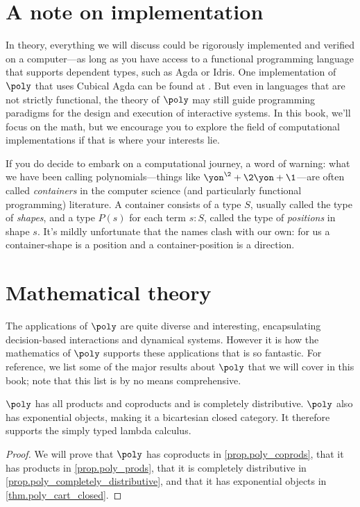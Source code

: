 
\section{A note on implementation} \label{sec.poly.intro.code}

In theory, everything we will discuss could be rigorously implemented and verified on a computer---as long as you have access to a functional programming language that supports dependent types, such as Agda or Idris.
One implementation of $\poly$ that uses Cubical Agda can be found at \cite{1lab-poly}.
But even in languages that are not strictly functional, the theory of $\poly$ may still guide programming paradigms for the design and execution of interactive systems.
In this book, we'll focus on the math, but we encourage you to explore the field of computational implementations if that is where your interests lie.

If you do decide to embark on a computational journey, a word of warning: what we have been calling polynomials---things like $\yon^\2+\2\yon+\1$---are often called \emph{containers} in the computer science (and particularly functional programming) literature. A container consists of a type $S$, usually called the type of \emph{shapes}, and a type $P(s)$ for each term $s:S$, called the type of \emph{positions} in shape $s$. It's mildly unfortunate that the names clash with our own: for us a container-shape is a position and a container-position is a direction.

\section{Mathematical theory} \label{sec.poly.intro.math_theory}


The applications of $\poly$ are quite diverse and interesting, encapsulating decision-based interactions and dynamical systems.
However it is how the mathematics of $\poly$ supports these applications that is so fantastic.
For reference, we list some of the major results about $\poly$ that we will cover in this book; note that this list is by no means comprehensive.

\begin{proposition}
    $\poly$ has all products and coproducts and is completely distributive.
    $\poly$ also has exponential objects, making it a bicartesian closed category.
    It therefore supports the simply typed lambda calculus.
\end{proposition}
\begin{proof}
    We will prove that $\poly$ has coproducts in \cref{prop.poly_coprods}, that it has products in \cref{prop.poly_prods}, that it is completely distributive in \cref{prop.poly_completely_distributive}, and that it has exponential objects in \cref{thm.poly_cart_closed}.
\end{proof}

